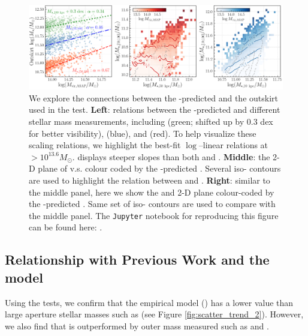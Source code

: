 \documentclass[fleqn,usenatbib,useAMS]{mnras}
\begin{document}
\begin{CJK*}{UTF8}{gbsn}
\begin{figure}
    \centering
    \includegraphics[width=\textwidth]{figure/fig_11}
    \caption{
        We explore the connections between the \asap{}-predicted \mvir{} and the outskirt 
        \mstar{} used in the \topn{} test. 
        \textbf{Left}: relations between the \asap{}-predicted \mvir{} and different stellar mass
        measurements, including  (green; shifted up by 0.3 dex for better visibility),
         (blue), and  (red).
        To help visualize these scaling relations, we highlight the best-fit $\log$--linear 
        relations at \masap{}$> 10^{13.6} M_{\odot}$.
         displays steeper slopes than both  and .
        \textbf{Middle}: the 2-D plane of  v.s.   colour coded by the
        \asap{}-predicted \mvir{}.
        Several iso-\mvir{} contours are used to highlight the relation between \mvir{} and
        .
        \textbf{Right}: similar to the middle panel, here we show the  and
         2-D plane colour-coded by the \asap{}-predicted \mvir{}.
        Same set of iso-\mvir{} contours are used to compare with the middle panel.
        The \texttt{Jupyter} notebook for reproducing this figure can be found here:
        \href{https://github.com/dr-guangtou/jianbing/blob/master/notebooks/figure/fig12.ipynb}{\faGithub}.
    }
    \label{fig:outskirt_discussion}
\end{figure}


\subsection{Relationship with Previous Work and the \asap{} model}
    \label{sec:asap_discussion}
    
    Using the \topn{} tests, we confirm that the \asap{} empirical model (\citealt{Huang2020}) has a
    lower \sigmvir{} value than large aperture stellar masses such as  (see Figure
    \ref{fig:scatter_trend_2}). 
    However, we also find that \asap{} is outperformed by outer mass measured such as
     and .


\end{CJK*}
\end{document}
